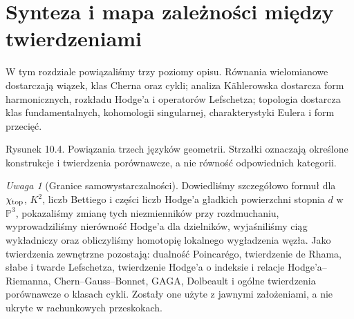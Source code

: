 \documentclass[11pt,a4paper,openany]{report}
\numberwithin{equation}{section}
\theoremstyle{plain}
\theoremstyle{definition}
\theoremstyle{remark}
\newtheorem{uwaga}[twierdzenie]{Uwaga}
\newcommand{\PP}{\mathbb P}
\begin{document}
\section{Synteza i mapa zależności między twierdzeniami}
\label{sec:ga10-koniec}

W tym rozdziale powiązaliśmy trzy poziomy opisu.
Równania wielomianowe dostarczają wiązek, klas Cherna
oraz cykli; analiza Kählerowska dostarcza form
harmonicznych, rozkładu Hodge'a i operatorów Lefschetza;
topologia dostarcza klas fundamentalnych, kohomologii
singularnej, charakterystyki Eulera i form przecięć.

\begin{center}

{\small Rysunek 10.4. Powiązania trzech języków geometrii.
Strzałki oznaczają określone konstrukcje i twierdzenia
porównawcze, a nie równość odpowiednich kategorii.}\par
\end{center}

\begin{uwaga}[Granice samowystarczalności]
Dowiedliśmy szczegółowo formuł dla $\chi_{\rm top}$,
$K^2$, liczb Bettiego i części liczb Hodge'a
gładkich powierzchni stopnia $d$ w $\PP^3$,
pokazaliśmy zmianę tych niezmienników przy rozdmuchaniu,
wyprowadziliśmy nierówność Hodge'a dla dzielników,
wyjaśniliśmy ciąg wykładniczy oraz obliczyliśmy
homotopię lokalnego wygładzenia węzła.
Jako twierdzenia zewnętrzne pozostają: dualność Poincarégo,
twierdzenie de Rhama, słabe i twarde Lefschetza,
twierdzenie Hodge'a o indeksie i relacje Hodge'a--Riemanna,
Chern--Gauss--Bonnet, GAGA, Dolbeault i ogólne twierdzenia
porównawcze o klasach cykli. Zostały one użyte z jawnymi
założeniami, a nie ukryte w rachunkowych przeskokach.
\end{uwaga}

\end{document}
